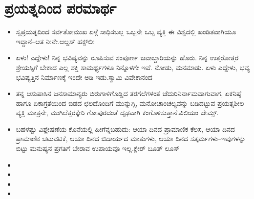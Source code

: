 
\chapter{ಪ್ರಯತ್ನದಿಂದ ಪರಮಾರ್ಥ}

\indentsecionsintoc

\begin{itemize}
\itemsep=3pt
\item ಸ್ವಪ್ರಯತ್ನದಿಂದ ಸರ್ವತೋಮುಖ ಏಳ್ಗೆ ಸಾಧಿಸಬಲ್ಲ ಒಬ್ಬನೇ ಒಬ್ಬ ವ್ಯಕ್ತಿ ಈ ವಿಶ್ವದಲ್ಲಿ ಖಂಡಿತವಾಗಿಯೂ ಇದ್ದಾನೆ–ಆತ ನೀನೇ.\hfill {}ಆಲ್ಡಸ್ ಹಕ್ಸ್​ಲೀ

 \item ಏಳು! ಎದ್ದೇಳು! ನಿನ್ನ ಭವಿಷ್ಯವನ್ನು ರೂಪಿಸುವ ಸಂಪೂರ್ಣ ಜವಾಬ್ದಾರಿಯನ್ನು ಹೊರು. ನಿನ್ನ ಉತ್ತರೋತ್ತರ ಶ್ರೇಯಸ್ಸಿಗೆ ಬೇಕಾದ ಎಲ್ಲ ಶಕ್ತಿ ಸಾಮರ್ಥ್ಯಗಳೂ ನಿನ್ನೊಳಗೇ ಇವೆ. ನೋಡು, ಮನಮಾಡು. ಏಳು ಎದ್ದೇಳು, ಭವ್ಯ ಭವಿಷ್ಯತ್ತಿನ ನಿರ್ಮಾಣಕ್ಕೆ ಇಂದೇ ಅಡಿ ಇಡು.\hfill {}ಸ್ವಾಮಿ ವಿವೇಕಾನಂದ

 \item ತನ್ನ ಆಸುಪಾಸಿನ ಜನಸಾಮಾನ್ಯರು ಬಿರುಗಾಳಿಗೊಡ್ಡಿದ ತರಗೆಲೆಗಳಂತೆ ಚೆದುರಿ\break ನಿರ್ನಾಮವಾಗುವಾಗ, ಏಕನಿಷ್ಠೆ ಹಾಗೂ ಏಕಾಗ್ರತೆಯಿಂದ ಬಿಡದ ಛಲದೊಂದಿಗೆ ಮುನ್ನುಗ್ಗಿ, ಮನೋಚಾಂಚಲ್ಯವನ್ನು ಬಡಿದಟ್ಟುವ ಪ್ರಯತ್ನಶೀಲ ವ್ಯಕ್ತಿ ಮಾತ್ರನೇ, ಮುಗಿಲೆತ್ತರಕ್ಕೇರಿ ಗೋಪುರದಂತೆ ದೃಢವಾಗಿ ಕಂಗೊಳಿಸುತ್ತಾನೆ.\hfill {}ವಿಲಿಯಂ ಜೇಮ್ಸ್.

 \item ಬಹಳಷ್ಟು ವಿಶ್ಲೇಷಣೆಯ ಕೊನೆಯಲ್ಲಿ ಹೀಗೆನ್ನಬಹುದು: ಆಯಾ ದಿನದ ಪ್ರಾಮಾಣಿಕ ಕೆಲಸ, ಆಯಾ ದಿನದ ಪ್ರಾಮಾಣಿಕ ಚಟುವಟಿಕೆ, ಆಯಾ ದಿನದ ಔದಾರ್ಯದ ಮಾತುಗಳು, ಆಯಾ ದಿನದ ಸತ್ಕರ್ಮಗಳು–ಇವುಗಳನ್ನು ಬಿಟ್ಟು ಮನುಷ್ಯನ ಪ್ರಗತಿಗೆ ಬೇರಾವ ಉಪಾಯವೂ ಇಲ್ಲ.\hfill {}ಕ್ಲೇರ್ ಬೂತ್ ಲೂಸ್​

 \item {}

 \item {}

 \item {}

 \item {}

\end{itemize}


